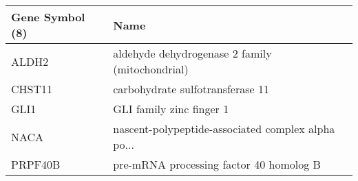 \begin{tabular}{ll}
\toprule
Gene Symbol (8) &                                               Name \\
\midrule
          ALDH2 &    aldehyde dehydrogenase 2 family (mitochondrial) \\
         CHST11 &                   carbohydrate sulfotransferase 11 \\
           GLI1 &                           GLI family zinc finger 1 \\
           NACA & nascent-polypeptide-associated complex alpha po... \\
        PRPF40B &            pre-mRNA processing factor 40 homolog B \\
\bottomrule
\end{tabular}
